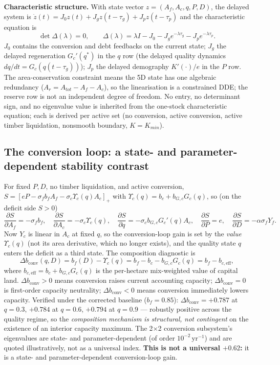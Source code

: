 \documentclass[11pt]{article}
\begin{document}
\noindent\textbf{Characteristic structure.} With state vector $z=(A_f,A_c,q,P,D)$, the delayed system is $\dot z(t)=J_0z(t)+J_gz(t-\tau_g)+J_pz(t-\tau_p)$ and the characteristic equation is
\[
\det\Delta(\lambda)=0,\qquad \Delta(\lambda)=\lambda I-J_0-J_ge^{-\lambda\tau_g}-J_pe^{-\lambda\tau_p}.
\]
$J_0$ contains the conversion and debt feedbacks on the current state; $J_g$ the delayed regeneration $G_c'(q^*)$ in the $q$ row (the delayed quality dynamics $dq/dt=G_c(q(t-\tau_g))$); $J_p$ the delayed demography $K'(\cdot)/e$ in the $P$ row. The area-conservation constraint means the 5D state has one algebraic redundancy ($A_r=A_{tot}-A_f-A_c$), so the linearisation is a constrained DDE; the reserve row is not an independent degree of freedom. No entry, no determinant sign, and no eigenvalue value is inherited from the one-stock characteristic equation; each is derived per active set (no conversion, active conversion, active timber liquidation, nonsmooth boundary, $K=K_{min}$).

\subsection{The conversion loop: a state- and parameter-dependent stability contrast}

For fixed $P,D$, no timber liquidation, and active conversion, $S=[eP-\sigma_fb_fA_f-\sigma_c\Upsilon_c(q)A_c]_+$ with $\Upsilon_c(q)=b_c+b_{G,c}G_c(q)$, so (on the deficit side $S>0$)
\[
\frac{\partial S}{\partial A_f}=-\sigma_fb_f,\quad
\frac{\partial S}{\partial A_c}=-\sigma_c\Upsilon_c(q),\quad
\frac{\partial S}{\partial q}=-\sigma_cb_{G,c}G_c'(q)A_c,\quad
\frac{\partial S}{\partial P}=e,\quad
\frac{\partial S}{\partial D}=-\alpha\sigma_fY_f.
\]
Now $Y_c$ is linear in $A_c$ at fixed $q$, so the conversion-loop gain is set by the \emph{value} $\Upsilon_c(q)$ (not its area derivative, which no longer exists), and the quality state $q$ enters the deficit as a third state. The composition diagnostic is
\[
\Delta b_{\mathrm{conv}}(q,D)=b_f(D)-\Upsilon_c(q)=b_f-b_c-b_{G,c}G_c(q)=b_f-b_{c,\mathrm{eff}},
\]
where $b_{c,\mathrm{eff}}=b_c+b_{G,c}G_c(q)$ is the per-hectare mix-weighted value of capital land. $\Delta b_{\mathrm{conv}}>0$ means conversion raises current accounting capacity; $\Delta b_{\mathrm{conv}}=0$ is first-order capacity neutrality; $\Delta b_{\mathrm{conv}}<0$ means conversion immediately lowers capacity. Verified under the corrected baseline ($b_f=0.85$): $\Delta b_{\mathrm{conv}}=+0.787$ at $q=0.3$, $+0.784$ at $q=0.6$, $+0.794$ at $q=0.9$ --- robustly positive across the quality regime, so the \emph{composition mechanism is structural, not contingent} on the existence of an interior capacity maximum. The 2$\times$2 conversion subsystem's eigenvalues are state- and parameter-dependent (of order $10^{-2}\,\text{yr}^{-1}$) and are quoted illustratively, not as a universal index. \textbf{This is not a universal $+0.62$:} it is a state- and parameter-dependent conversion-loop gain.
\end{document}
